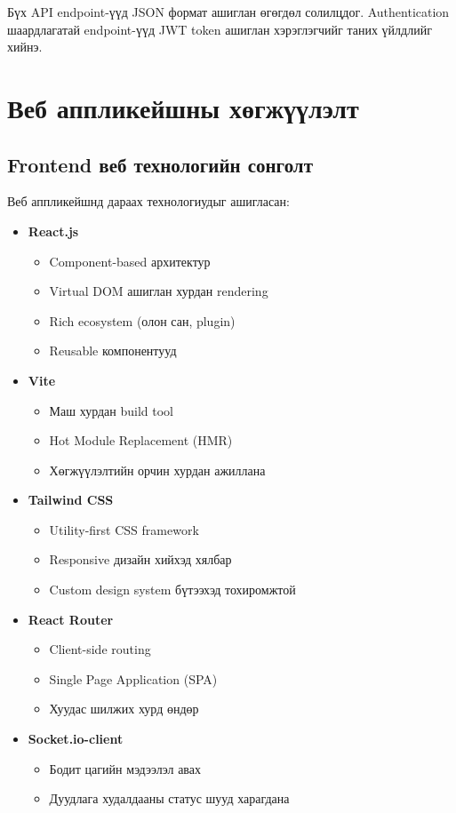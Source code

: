 Бүх API endpoint-үүд JSON формат ашиглан өгөгдөл солилцдог. Authentication шаардлагатай endpoint-үүд JWT token ашиглан хэрэглэгчийг таних үйлдлийг хийнэ.

\section{Веб аппликейшны хөгжүүлэлт}
\subsection{Frontend веб технологийн сонголт}
Веб аппликейшнд дараах технологиудыг ашигласан:
\begin{itemize}
    \item \textbf{React.js}
    \begin{itemize}
   \item Component-based архитектур
   \item Virtual DOM ашиглан хурдан rendering
   \item Rich ecosystem (олон сан, plugin)
   \item Reusable компонентууд
\end{itemize}
    \item \textbf{Vite}
    \begin{itemize}
   \item Маш хурдан build tool
   \item Hot Module Replacement (HMR)
   \item Хөгжүүлэлтийн орчин хурдан ажиллана
\end{itemize}
    \item \textbf{Tailwind CSS}
    \begin{itemize}
   \item Utility-first CSS framework
   \item Responsive дизайн хийхэд хялбар
   \item Custom design system бүтээхэд тохиромжтой
\end{itemize}
    \item \textbf{React Router}
    \begin{itemize}
   \item Client-side routing
   \item Single Page Application (SPA)
   \item Хуудас шилжих хурд өндөр
\end{itemize}
    \item \textbf{Socket.io-client}
    \begin{itemize}
   \item Бодит цагийн мэдээлэл авах
   \item Дуудлага худалдааны статус шууд харагдана
\end{itemize}
\end{itemize}

